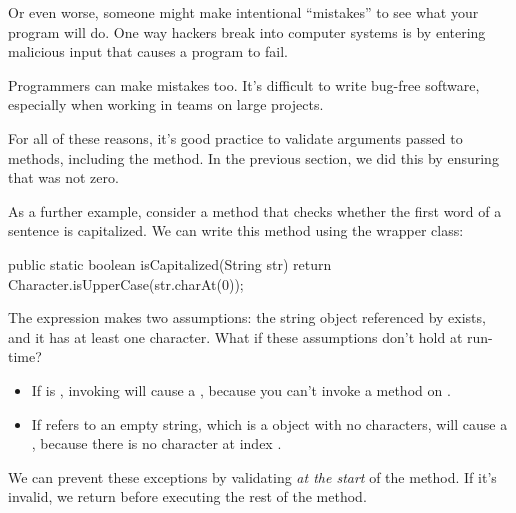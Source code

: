 
Or even worse, someone might make intentional ``mistakes'' to see what your program will do.
One way hackers break into computer systems is by entering malicious input that causes a program to fail.

Programmers can make mistakes too.
It's difficult to write bug-free software, especially when working in teams on large projects.


For all of these reasons, it's good practice to validate arguments passed to methods, including the  method.
In the previous section, we did this by ensuring that  was not zero.


As a further example, consider a method that checks whether the first word of a sentence is capitalized.
We can write this method using the  wrapper class:

\begin{code}
public static boolean isCapitalized(String str) {
    return Character.isUpperCase(str.charAt(0));
}
\end{code}

The expression  makes two assumptions: the string object referenced by  exists, and it has at least one character.
What if these assumptions don't hold at run-time?


\begin{itemize}

\item If  is , invoking  will cause a , because you can't invoke a method on .

\item If  refers to an empty string, which is a  object with no characters,  will cause a , because there is no character at index .

\end{itemize}


We can prevent these exceptions by validating  {\em at the start} of the method.
If it's invalid, we return before executing the rest of the method.

